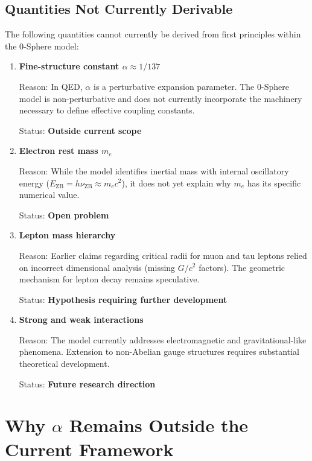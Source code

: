 \documentclass[12pt,letterpaper]{article}
\begin{document}
\subsection{Quantities Not Currently Derivable}
The following quantities cannot currently be derived from first principles within the 0-Sphere model:

\begin{enumerate}
\item \textbf{Fine-structure constant $\alpha \approx 1/137$}

Reason: In QED, $\alpha$ is a perturbative expansion parameter. The 0-Sphere model is non-perturbative and does not currently incorporate the machinery necessary to define effective coupling constants.

Status: \textbf{Outside current scope}

\item \textbf{Electron rest mass $m_e$}

Reason: While the model identifies inertial mass with internal oscillatory energy ($E_{\mathrm{ZB}} = h\nu_{\mathrm{ZB}} \approx m_e c^2$), it does not yet explain why $m_e$ has its specific numerical value.

Status: \textbf{Open problem}

\item \textbf{Lepton mass hierarchy}

Reason: Earlier claims regarding critical radii for muon and tau leptons relied on incorrect dimensional analysis (missing $G/c^2$ factors). The geometric mechanism for lepton decay remains speculative.

Status: \textbf{Hypothesis requiring further development}

\item \textbf{Strong and weak interactions}

Reason: The model currently addresses electromagnetic and gravitational-like phenomena. Extension to non-Abelian gauge structures requires substantial theoretical development.

Status: \textbf{Future research direction}

\end{enumerate}

\section{Why $\alpha$ Remains Outside the Current Framework}
\end{document}
